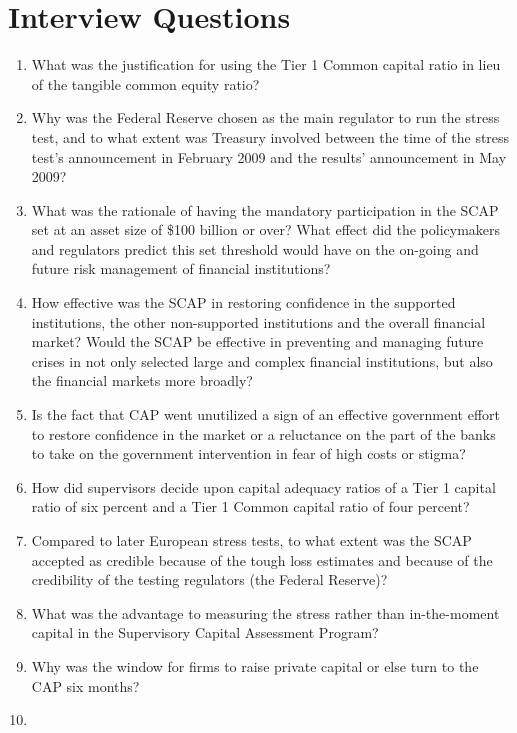 \documentclass[justified, nobib]{tufte-handout2}
\begin{document}
\section{Interview Questions}

\begin{enumerate}

\item
  What was the justification for using the Tier 1 Common capital ratio
  in lieu of the tangible common equity ratio?
\item
  Why was the Federal Reserve chosen as the main regulator to run the
  stress test, and to what extent was Treasury involved between the
  time of the stress test's announcement in February 2009 and the
  results' announcement in May 2009?
\item
  What was the rationale of having the mandatory participation in the
  SCAP set at an asset size of \$100 billion or over? What effect did
  the policymakers and regulators predict this set threshold would have
  on the on-going and future risk management of financial institutions?
\item
  How effective was the SCAP in restoring confidence in the supported
  institutions, the other non-supported institutions and the overall
  financial market? Would the SCAP be effective in preventing and
  managing future crises in not only selected large and complex
  financial institutions, but also the financial markets more broadly?
\item
  Is the fact that CAP went unutilized a sign of an effective government
  effort to restore confidence in the market or a reluctance on the part
  of the banks to take on the government intervention in fear of high
  costs or stigma?
\item
  How did supervisors decide upon capital adequacy ratios of a Tier 1
  capital ratio of six percent and a Tier 1 Common capital ratio of four
  percent?
\item
  Compared to later European stress tests, to what extent was the SCAP
  accepted as credible because of the tough loss estimates and because
  of the credibility of the testing regulators (the Federal Reserve)?
\item
  What was the advantage to measuring the stress rather than
  in-the-moment capital in the Supervisory Capital Assessment Program?
\item
  Why was the window for firms to raise private capital or else turn to
  the CAP six months?
\item

\end{enumerate}
\end{document}
